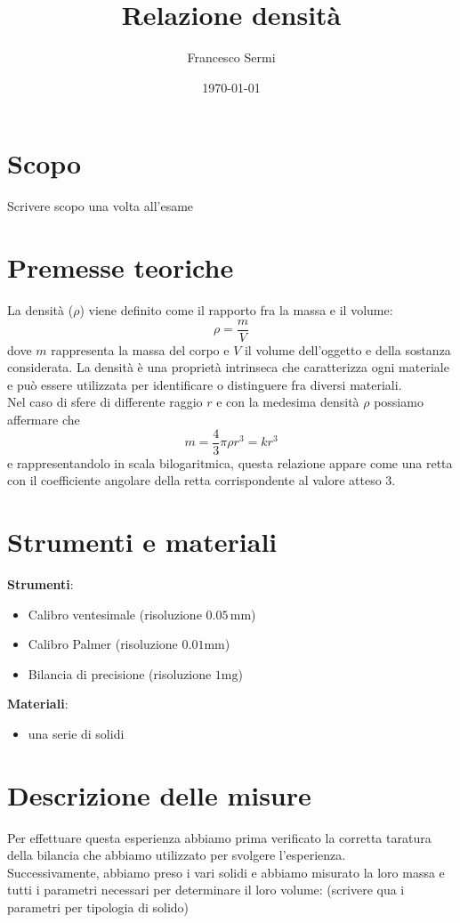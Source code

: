 \documentclass{article}
\title{Relazione densità}
\author{Francesco Sermi}
\date{\today}
\begin{document}
	\maketitle
	\section{Scopo}
	Scrivere scopo una volta all'esame
	\section{Premesse teoriche}
	La densità ($\rho$) viene definito come il rapporto fra la massa e il volume:
	\begin{equation}
		\rho = \frac{m}{V}
	\end{equation}
	dove $m$ rappresenta la massa del corpo e $V$ il volume dell'oggetto e della sostanza considerata. La densità è una proprietà intrinseca che caratterizza ogni materiale e può essere utilizzata per identificare o distinguere fra diversi materiali. \\
	Nel caso di sfere di differente raggio $r$ e con la medesima densità $\rho$ possiamo affermare che
	\begin{equation}
	m = \frac{4}{3} \pi \rho r^3 = kr^3
	\end{equation}
	e rappresentandolo in scala bilogaritmica, questa relazione appare come una retta con il coefficiente angolare della retta corrispondente al valore atteso 3.
\section{Strumenti e materiali}
	\textbf{Strumenti}:	
	\begin{itemize}
		\item Calibro ventesimale (risoluzione $0.05 \, \si{\milli\meter}$)
		\item Calibro Palmer (risoluzione $0.01 \si{\milli\meter}$)
		\item Bilancia di precisione (risoluzione $1 \si{\milli\gram}$)
	\end{itemize}
	\textbf{Materiali}:
	\begin{itemize}
		\item una serie di solidi
	\end{itemize}
\section{Descrizione delle misure}
Per effettuare questa esperienza abbiamo prima verificato la corretta taratura della bilancia che abbiamo utilizzato per svolgere l'esperienza. \\
Successivamente, abbiamo preso i vari solidi e abbiamo misurato la loro massa e tutti i parametri necessari per determinare il loro volume: (scrivere qua i parametri per tipologia di solido)
\end{document}
